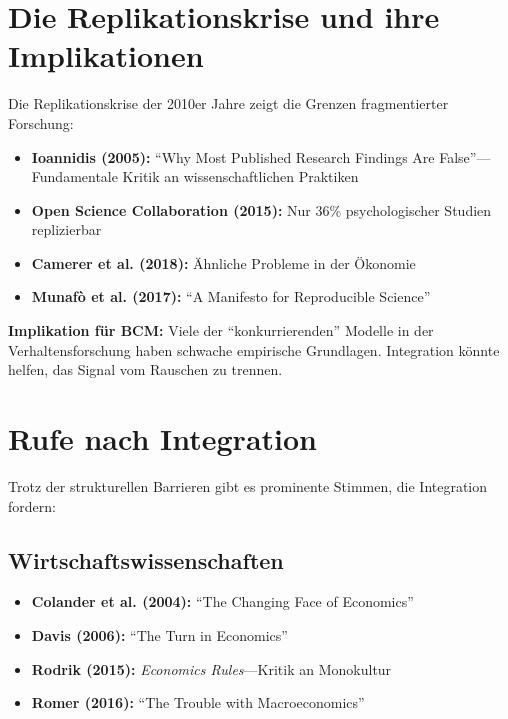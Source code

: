 \documentclass[12pt,a4paper]{article}
\begin{document}
\section{Die Replikationskrise und ihre Implikationen}

Die Replikationskrise der 2010er Jahre zeigt die Grenzen fragmentierter Forschung:

\begin{itemize}
\item \textbf{Ioannidis (2005):} ``Why Most Published Research Findings Are False''---
      Fundamentale Kritik an wissenschaftlichen Praktiken
\item \textbf{Open Science Collaboration (2015):} Nur 36\% psychologischer Studien replizierbar
\item \textbf{Camerer et al. (2018):} Ähnliche Probleme in der Ökonomie
\item \textbf{Munafò et al. (2017):} ``A Manifesto for Reproducible Science''
\end{itemize}

\textbf{Implikation für BCM:} Viele der ``konkurrierenden'' Modelle in der
Verhaltensforschung haben schwache empirische Grundlagen. Integration könnte
helfen, das Signal vom Rauschen zu trennen.

\section{Rufe nach Integration}

Trotz der strukturellen Barrieren gibt es prominente Stimmen, die Integration fordern:

\subsection{Wirtschaftswissenschaften}

\begin{itemize}[nosep]
\item \textbf{Colander et al. (2004):} ``The Changing Face of Economics''
\item \textbf{Davis (2006):} ``The Turn in Economics''
\item \textbf{Rodrik (2015):} \textit{Economics Rules}---Kritik an Monokultur
\item \textbf{Romer (2016):} ``The Trouble with Macroeconomics''
\end{itemize}
\end{document}
